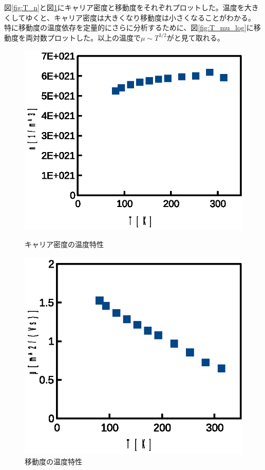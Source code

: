 \documentclass[11pt,a4]{jarticle}
\begin{document}
図\ref{fig:T_n}と図\ref{fig:T_mu}にキャリア密度と移動度をそれぞれプロットした。温度を大きくしてゆくと、キャリア密度は大きくなり移動度は小さくなることがわかる。
特に移動度の温度依存を定量的にさらに分析するために、図\ref{fig:T_mu_log}に移動度を両対数プロットした。以上の温度で$\mu \sim T^{3/2}$がと見て取れる。
\begin{figure}[htbp]
 \begin{minipage}{0.5\hsize}
   \begin{center}
    \includegraphics[width=0.8\hsize]{./T_n.eps}
    \caption{キャリア密度の温度特性}
     \label{fig:T_n}
   \end{center}
 \end{minipage}
 \begin{minipage}{0.5\hsize}
   \begin{center}
    \includegraphics[width=0.8\hsize]{./T_mu.eps}
    \caption{移動度の温度特性}
     \label{fig:T_mu}
   \end{center}
 \end{minipage}
\end{figure}
\end{document}
